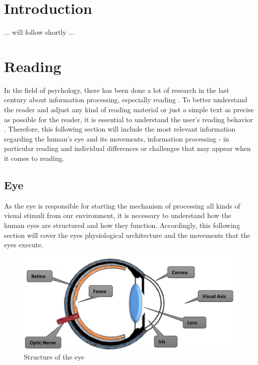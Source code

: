 \section{Introduction}
\label{section:Introduction}
... will follow shortly ...

\section{Reading}
\label{section:Reading}

In the field of psychology, there has been done a lot of research in the last century about information processing, especially reading \autocite{rayner1998eye, biedert2010eyebook}. 
To better understand the reader and adjust any kind of reading material or just a simple text as precise as possible for the reader, it is essential to understand the user's reading behavior \autocite{biedert2010eyebook}. 
Therefore, this following section will include the most relevant information regarding the human's eye and its movements, information processing - in particular reading and individual differences or challenges that may appear when it comes to reading.

\subsection{Eye}
\label{subsection:Eye}
As the eye is responsible for starting the mechanism of processing all kinds of visual stimuli from our environment, it is necessary to understand how the human eyes are structured and how they function. Accordingly, this following section will cover the eyes physiological architecture and the movements that the eyes execute.

\begin{figure}[!ht]
    \centering
    \includegraphics[width=0.75\linewidth]{images/Eye_djamasbi2014eye.png}
    \caption{
       Structure of the eye \autocite[38]{djamasbi2014eye}
    }
    \label{figure:Eye}
\end{figure}

